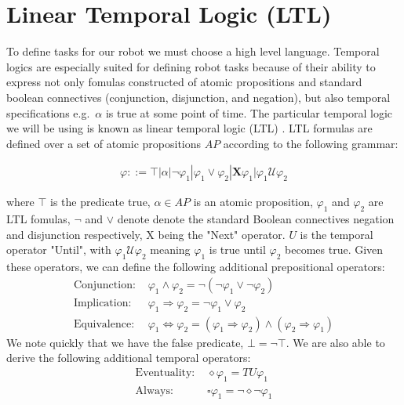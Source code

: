 \section{Linear Temporal Logic (LTL)}
To define tasks for our robot we must choose a high level language. Temporal logics are especially suited for defining robot tasks because of their ability to express not only fomulas constructed of atomic propositions and standard boolean connectives (conjunction, disjunction, and negation), but also temporal specifications e.g.\ $\alpha$ is true at some point of time. The particular temporal logic we will be using is known as linear temporal logic (LTL) \cite{clarke99}. LTL formulas are defined over a set of atomic propositions $AP$ according to the following grammar:

\begin{align*}
    \varphi ::= \top | \alpha | \neg \varphi_1 | \varphi_1  \lor \varphi_2 | \textbf{X} \varphi_1 | \varphi_1 \bm{\mathcal{U}} \varphi_2
\end{align*}

where $\top$ is the predicate true, $\alpha \in AP$ is an atomic proposition, $\varphi_1$ and $\varphi_2$ are LTL fomulas, $\neg$ and $\lor$ denote denote the standard Boolean connectives negation and disjunction respectively, X being the "Next" operator. $U$ is the temporal operator "Until", with $\varphi_1 \mathcal{U} \varphi_2$ meaning $\varphi_1$ is true until $\varphi_2$ becomes true. Given these operators, we can define the following additional prepositional operators:
\begin{align*}
    \text{Conjunction: }&  \varphi_1  \land \varphi_2 = \neg(\neg \varphi_1 \lor \neg \varphi_2) \\
    \text{Implication: }& \varphi_1 \Rightarrow \varphi_2 = \neg \varphi_1 \lor \varphi_2 \\
    \text{Equivalence: }& \varphi_1 \Leftrightarrow \varphi_2 = (\varphi_1 \Rightarrow \varphi_2) \land (\varphi_2 \Rightarrow \varphi_1)
\end{align*}
We note quickly that we have the false predicate, $\bot = \neg \top$.
We are also able to derive the following additional temporal operators:
\begin{align*}
    \text{Eventuality: }& \diamond \varphi_1 = T U \varphi_1 \\
    \text{Always: }& \square \varphi_1 = \neg \diamond \neg \varphi_1
\end{align*}

